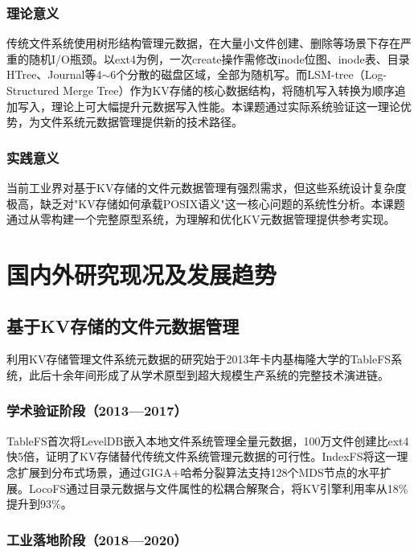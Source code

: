 \documentclass[supercite]{Hust-undergraduate-kaiti}
\theoremstyle{definition}
\begin{document}
\subsubsection{理论意义}

传统文件系统使用树形结构管理元数据，在大量小文件创建、删除等场景下存在严重的随机I/O瓶颈。以ext4为例，一次create操作需修改inode位图、inode表、目录HTree、Journal等4$\sim$6个分散的磁盘区域，全部为随机写。而LSM-tree（Log-Structured Merge Tree）作为KV存储的核心数据结构，将随机写入转换为顺序追加写入，理论上可大幅提升元数据写入性能\cite{ref_lsm}。本课题通过实际系统验证这一理论优势，为文件系统元数据管理提供新的技术路径。

\subsubsection{实践意义}

当前工业界对基于KV存储的文件元数据管理有强烈需求，但这些系统设计复杂度极高，缺乏对"KV存储如何承载POSIX语义"这一核心问题的系统性分析。本课题通过从零构建一个完整原型系统，为理解和优化KV元数据管理提供参考实现。

\section{国内外研究现况及发展趋势}
\subsection{基于KV存储的文件元数据管理}

利用KV存储管理文件系统元数据的研究始于2013年卡内基梅隆大学的TableFS系统，此后十余年间形成了从学术原型到超大规模生产系统的完整技术演进链。

\subsubsection{学术验证阶段（2013—2017）}

TableFS\cite{ref_tablefs}首次将LevelDB嵌入本地文件系统管理全量元数据，100万文件创建比ext4快5倍，证明了KV存储替代传统文件系统管理元数据的可行性。IndexFS\cite{ref_indexfs}将这一理念扩展到分布式场景，通过GIGA+哈希分裂算法支持128个MDS节点的水平扩展。LocoFS\cite{ref_locofs}通过目录元数据与文件属性的松耦合解聚合，将KV引擎利用率从18\%提升到93\%。

\subsubsection{工业落地阶段（2018—2020）}
\end{document}
